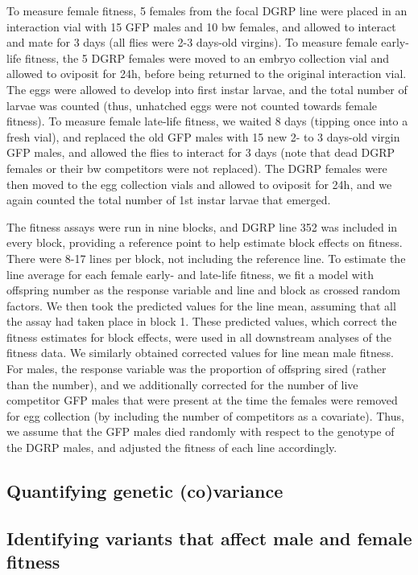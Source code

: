 \documentclass{article}
\begin{document}
To measure female fitness, 5 females from the focal DGRP line were
placed in an interaction vial with 15 GFP males and 10 bw females, and
allowed to interact and mate for 3 days (all flies were 2-3 days-old
virgins). To measure female early-life fitness, the 5 DGRP females were
moved to an embryo collection vial and allowed to oviposit for 24h,
before being returned to the original interaction vial. The eggs were
allowed to develop into first instar larvae, and the total number of
larvae was counted (thus, unhatched eggs were not counted towards female
fitness). To measure female late-life fitness, we waited 8 days (tipping
once into a fresh vial), and replaced the old GFP males with 15 new 2-
to 3 days-old virgin GFP males, and allowed the flies to interact for 3
days (note that dead DGRP females or their bw competitors were not
replaced). The DGRP females were then moved to the egg collection vials
and allowed to oviposit for 24h, and we again counted the total number
of 1st instar larvae that emerged.

The fitness assays were run in nine blocks, and DGRP line 352 was
included in every block, providing a reference point to help estimate
block effects on fitness. There were 8-17 lines per block, not including
the reference line. To estimate the line average for each female early-
and late-life fitness, we fit a model with offspring number as the
response variable and line and block as crossed random factors. We then
took the predicted values for the line mean, assuming that all the assay
had taken place in block 1. These predicted values, which correct the
fitness estimates for block effects, were used in all downstream
analyses of the fitness data. We similarly obtained corrected values for
line mean male fitness. For males, the response variable was the
proportion of offspring sired (rather than the number), and we
additionally corrected for the number of live competitor GFP males that
were present at the time the females were removed for egg collection (by
including the number of competitors as a covariate). Thus, we assume
that the GFP males died randomly with respect to the genotype of the
DGRP males, and adjusted the fitness of each line accordingly.

\subsection*{Quantifying genetic (co)variance}

\subsection*{Identifying variants that affect male and female fitness}
\end{document}
